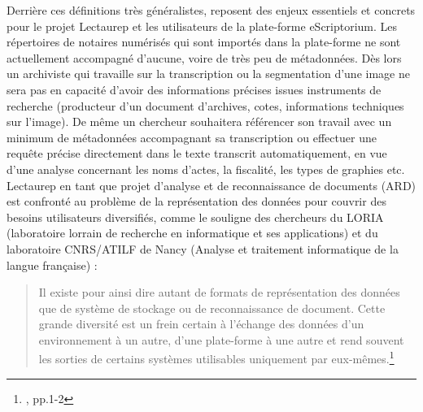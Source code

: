 Derrière ces définitions très généralistes, reposent des enjeux essentiels et concrets pour le projet Lectaurep et les utilisateurs de la plate-forme eScriptorium. Les répertoires de notaires numérisés qui sont importés dans la plate-forme ne sont actuellement accompagné d'aucune, voire de très peu de métadonnées. Dès lors un archiviste qui travaille sur la transcription ou la segmentation d'une image ne sera pas en capacité d'avoir des informations précises issues instruments de recherche (producteur d'un document d'archives, cotes, informations techniques sur l'image). De même un chercheur souhaitera référencer son travail avec un minimum de métadonnées accompagnant sa transcription ou effectuer une requête précise directement dans le texte transcrit automatiquement, en vue d'une analyse concernant les noms d'actes, la fiscalité, les types de graphies etc. %
Lectaurep en tant que projet d'analyse et de reconnaissance de documents (ARD) est confronté au problème de la représentation des données pour couvrir des besoins utilisateurs diversifiés, comme le souligne des chercheurs du LORIA (laboratoire lorrain de recherche en informatique et ses applications) et du laboratoire CNRS/ATILF de Nancy (Analyse et traitement informatique de la langue française) : 
\begin{quote}
    Il existe pour ainsi dire autant de formats de représentation des données que de système de stockage ou de reconnaissance de document. Cette grande diversité est un frein certain à l'échange des données d'un environnement à un autre, d'une plate-forme à une autre et rend souvent les sorties de certains systèmes utilisables uniquement par eux-mêmes.\footnote{\cite{belaid_representation_2007}, pp.1-2}
\end{quote}

